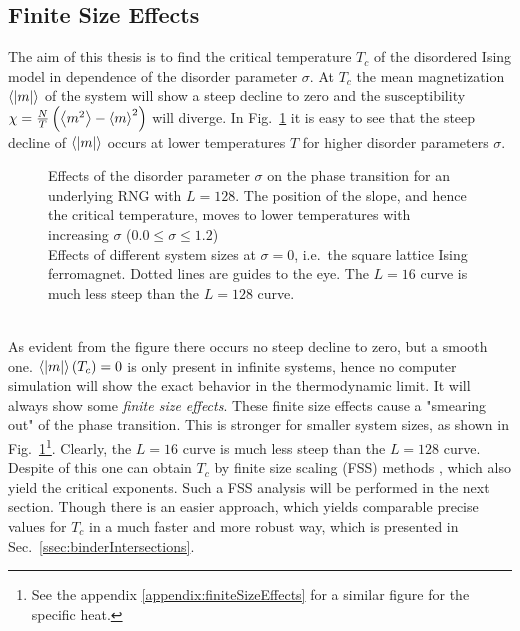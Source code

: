 \subsection{Finite Size Effects}
\label{ssec:finitesize}
    The aim of this thesis is to find the critical temperature \(T_c\)
    of the disordered Ising model in dependence of the disorder parameter
    \(\sigma\). At \(T_c\) the mean magnetization \(\left< |m| \right>\) of
    the system will show a steep decline to zero and the susceptibility
    \(\chi = \frac{N}{T}\left(\left< m^2 \right>-\left< m \right>^2\right)\)
    will diverge. In Fig.\ \ref{fig:smeared_out}
    it is easy to see that the steep decline of \(\left< |m| \right>\)
    occurs at lower temperatures \(T\) for higher
    disorder parameters \(\sigma\).
    \begin{figure}[htbp]
        \centering
        \caption[Phase Transition and Finite Size Effects]
        {
             Effects of the disorder
            parameter $\sigma$ on the phase transition
            for an underlying RNG with $L=128$. The position of the slope,
            and hence the critical temperature, moves to lower temperatures
            with increasing \(\sigma\) (\(0.0 \le \sigma \le 1.2\))\\
             Effects of different system
            sizes at \(\sigma = 0\), i.e.\ the square lattice Ising ferromagnet.
            Dotted lines are guides to the eye.
            The \(L=16\) curve is much less steep than the \(L=128\) curve.
        }
        \label{fig:smeared_out}
    \end{figure}\\
    As evident from the figure there occurs no steep decline to zero, but a
    smooth one. \(\left< \left\vert m\right\vert \right>(T_c) = 0\) is only present in infinite
    systems, hence no computer simulation will show the exact behavior in the
    thermodynamic limit. It will always show some \emph{finite size effects}.
    These finite size effects cause a "smearing out" of the phase
    transition. This is stronger for smaller system sizes, as shown
    in Fig.\ \ref{fig:smeared_out}\footnote{See the appendix \ref{appendix:finiteSizeEffects} for a similar figure for the specific heat.}.
    Clearly, the \(L=16\) curve is much less steep than the \(L=128\) curve.\\
    Despite of this one can obtain \(T_c\) by finite size scaling (FSS)
    methods \cite[p. 232ff]{NewmanBarkema1999}, which also yield the critical
    exponents. Such a FSS analysis will be performed in the next section.
    Though there is an easier approach, which yields comparable precise
    values for \(T_{c}\) in a much faster and more robust way, which is
    presented in Sec.\ \ref{ssec:binderIntersections}.

